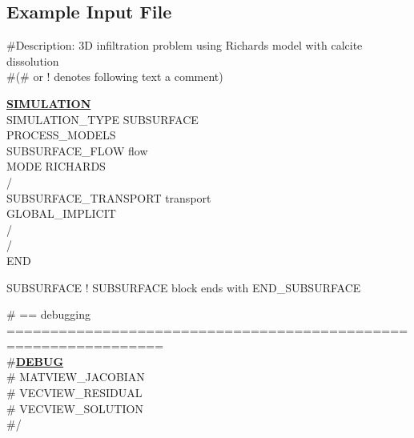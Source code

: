 \subsection{Example Input File}\label{exinput}

\hypertarget{target_input_file}{}

\footnotesize
\#Description: 3D infiltration problem using Richards model with calcite dissolution\\
\noindent
\#(\# or ! denotes following text a comment)

\noindent
\hyperlink{target_simulation}{\bf SIMULATION}\\
  SIMULATION\_TYPE SUBSURFACE\\
  PROCESS\_MODELS\\
    SUBSURFACE\_FLOW flow\\
      MODE RICHARDS\\
    /\\
    SUBSURFACE\_TRANSPORT transport\\
      GLOBAL\_IMPLICIT\\
    /\\
  /\\
END

\noindent
SUBSURFACE ! SUBSURFACE block ends with END\_SUBSURFACE

\noindent
\# == debugging ================================================================\\
\#\hyperlink{target_dbg}{\bf DEBUG}\\
\#  MATVIEW\_JACOBIAN\\
\#  VECVIEW\_RESIDUAL\\
\#  VECVIEW\_SOLUTION\\
\#/

